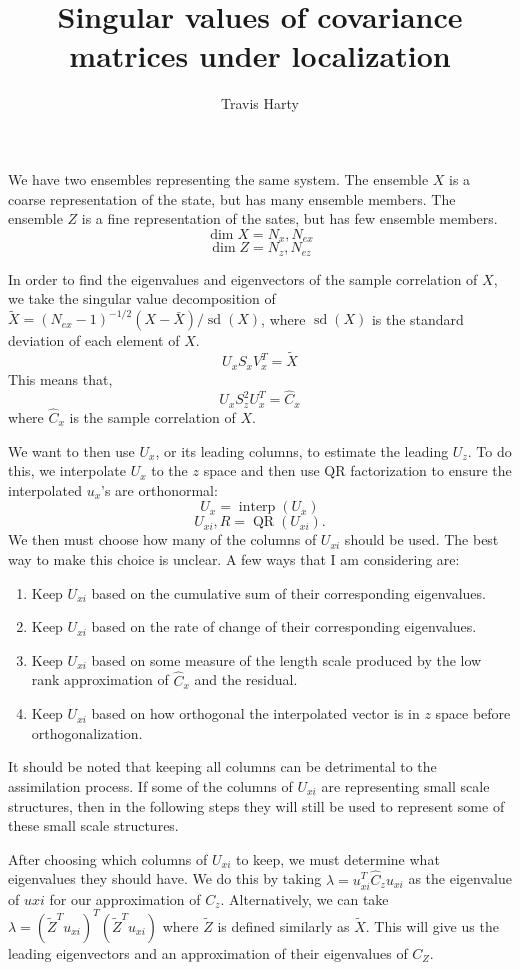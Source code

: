 \documentclass[11pt]{article} %
\title{Singular values of covariance matrices under localization}
\author{Travis Harty}
\date{} %
\DeclareMathOperator{\interp}{interp}
\DeclareMathOperator{\QR}{QR}
\DeclareMathOperator{\sd}{sd}
\begin{document}
\maketitle

We have two ensembles representing the same system.
The ensemble $X$ is a coarse representation of the state, but has many ensemble members.
The ensemble $Z$ is a fine representation of the sates, but has few ensemble members.
\[
\dim{X} = N_x, N_{ex}
\]
\[
\dim{Z} = N_z, N_{ez}
\]

In order to find the eigenvalues and eigenvectors of the sample correlation of $X$, we take the singular value decomposition of $\tilde{X} = {(N_{ex} - 1)}^{-1/2} (X - \bar{X})/ \sd(X)$, where $\sd(X)$ is the standard deviation of each element of $X$.
\[
U_x S_x V_x^T = \tilde{X}
\]
This means that,
\[
U_x S_z^2 U_x^T = \hat{C}_x
\]
where $\hat{C}_x$ is the sample correlation of $X$.

We want to then use $U_x$, or its leading columns, to estimate the leading $U_z$.
To do this, we interpolate $U_x$ to the $z$ space and then use QR factorization to ensure the interpolated $u_x$'s are orthonormal:
\[
U_{x} = \interp (U_x)
\]
\[
U_{xi}, R = \QR (U_{xi}).
\]
We then must choose how many of the columns of $U_{xi}$ should be used.
The best way to make this choice is unclear.
A few ways that I am considering are:
\begin{enumerate}
\item Keep $U_{xi}$ based on the cumulative sum of their corresponding eigenvalues.
\item Keep $U_{xi}$ based on the rate of change of their corresponding eigenvalues.
\item Keep $U_{xi}$ based on some measure of the length scale produced by the low rank approximation of $\hat{C}_x$ and the residual.
\item Keep $U_{xi}$ based on how orthogonal the interpolated vector is in $z$ space before orthogonalization.
\end{enumerate}
It should be noted that keeping all columns can be detrimental to the assimilation process.
If some of the columns of $U_{xi}$ are representing small scale structures, then in the following steps they will still be used to represent some of these small scale structures.

After choosing which columns of $U_{xi}$ to keep, we must determine what eigenvalues they should have.
We do this by taking $\lambda = u_{xi}^T \hat{C}_z u_{xi}$ as the eigenvalue of $u{xi}$ for our approximation of $C_z$.
Alternatively, we can take $\lambda = {(\tilde{Z}^T u_{xi})}^T (\tilde{Z}^T u_{xi})$ where $\tilde{Z}$ is defined similarly as $\tilde{X}$.
This will give us the leading eigenvectors and an approximation of their eigenvalues of $C_Z$.
\end{document}
